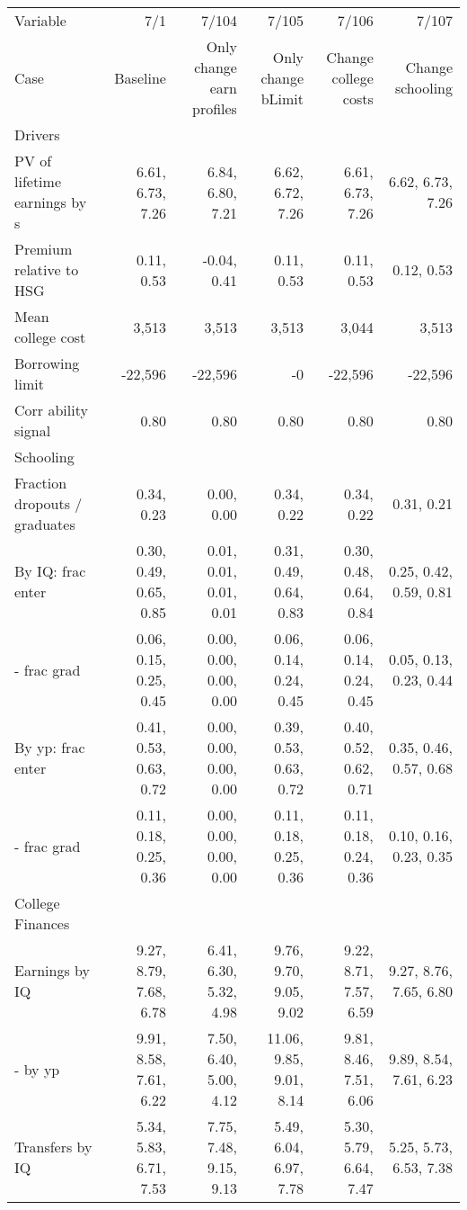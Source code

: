 \begin{tabular}{lrrrrr}
\hline
Variable & 7/1  & 7/104  & 7/105  & 7/106  & 7/107  \\ 
Case & Baseline  & Only change earn profiles  & Only change bLimit  & Change college costs  & Change schooling  \\ 
Drivers &   &   &   &   &   \\ 
PV of lifetime earnings by s & 6.61, 6.73, 7.26  & 6.84, 6.80, 7.21  & 6.62, 6.72, 7.26  & 6.61, 6.73, 7.26  & 6.62, 6.73, 7.26  \\ 
Premium relative to HSG & 0.11, 0.53  & -0.04, 0.41  & 0.11, 0.53  & 0.11, 0.53  & 0.12, 0.53  \\ 
Mean college cost & 3,513  & 3,513  & 3,513  & 3,044  & 3,513  \\ 
Borrowing limit & -22,596  & -22,596  & -0  & -22,596  & -22,596  \\ 
Corr ability signal & 0.80  & 0.80  & 0.80  & 0.80  & 0.80  \\ 
\hline
Schooling &   &   &   &   &   \\ 
Fraction dropouts / graduates & 0.34, 0.23  & 0.00, 0.00  & 0.34, 0.22  & 0.34, 0.22  & 0.31, 0.21  \\ 
By IQ: frac enter & 0.30, 0.49, 0.65, 0.85  & 0.01, 0.01, 0.01, 0.01  & 0.31, 0.49, 0.64, 0.83  & 0.30, 0.48, 0.64, 0.84  & 0.25, 0.42, 0.59, 0.81  \\ 
- frac grad & 0.06, 0.15, 0.25, 0.45  & 0.00, 0.00, 0.00, 0.00  & 0.06, 0.14, 0.24, 0.45  & 0.06, 0.14, 0.24, 0.45  & 0.05, 0.13, 0.23, 0.44  \\ 
By yp: frac enter & 0.41, 0.53, 0.63, 0.72  & 0.00, 0.00, 0.00, 0.00  & 0.39, 0.53, 0.63, 0.72  & 0.40, 0.52, 0.62, 0.71  & 0.35, 0.46, 0.57, 0.68  \\ 
- frac grad & 0.11, 0.18, 0.25, 0.36  & 0.00, 0.00, 0.00, 0.00  & 0.11, 0.18, 0.25, 0.36  & 0.11, 0.18, 0.24, 0.36  & 0.10, 0.16, 0.23, 0.35  \\ 
\hline
College Finances &   &   &   &   &   \\ 
Earnings by IQ & 9.27, 8.79, 7.68, 6.78  & 6.41, 6.30, 5.32, 4.98  & 9.76, 9.70, 9.05, 9.02  & 9.22, 8.71, 7.57, 6.59  & 9.27, 8.76, 7.65, 6.80  \\ 
- by yp & 9.91, 8.58, 7.61, 6.22  & 7.50, 6.40, 5.00, 4.12  & 11.06, 9.85, 9.01, 8.14  & 9.81, 8.46, 7.51, 6.06  & 9.89, 8.54, 7.61, 6.23  \\ 
Transfers by IQ & 5.34, 5.83, 6.71, 7.53  & 7.75, 7.48, 9.15, 9.13  & 5.49, 6.04, 6.97, 7.78  & 5.30, 5.79, 6.64, 7.47  & 5.25, 5.73, 6.53, 7.38  \\ 

\end{tabular}
